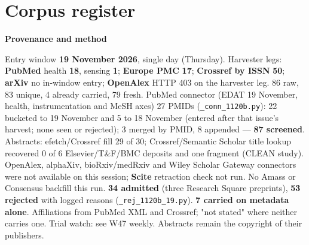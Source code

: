 \documentclass[10pt]{article}
\begin{document}
\clearpage
\section*{\sffamily\bfseries\color{Deep}Corpus register}
\vspace{-1.5mm}{\color{Amber}\rule{\linewidth}{1.1pt}}\vspace{2.5mm}



\vspace{2mm}

\begin{keybox}
{\sffamily\bfseries\footnotesize\color{Deep}Provenance and method}\\[1.2mm]
{\fontsize{7.2}{8.8}\selectfont
Entry window \textbf{19 November 2026}, single day (Thursday). Harvester legs: \textbf{PubMed} health \textbf{18}, sensing \textbf{1}; \textbf{Europe PMC} \textbf{17}; \textbf{Crossref by ISSN} \textbf{50}; \textbf{arXiv} no in-window entry; \textbf{OpenAlex} HTTP 403 on the harvester leg. 86 raw, 83 unique, 4 already carried, 79 fresh. PubMed connector (EDAT 19 November, health, instrumentation and MeSH axes) 27 PMIDs (\texttt{\_conn\_1120b.py}): 22 bucketed to 19 November and 5 to 18 November (entered after that issue's harvest; none seen or rejected); 3 merged by PMID, 8 appended --- \textbf{87 screened}. Abstracts: efetch/Crossref fill 29 of 30; Crossref/Semantic Scholar title lookup recovered 0 of 6 Elsevier/T\&F/BMC deposits and one fragment (CLEAN study).
OpenAlex, alphaXiv, bioRxiv/medRxiv and Wiley Scholar Gateway connectors were not available on this session; \textbf{Scite} retraction check not run. No Amass or Consensus backfill this run.
\textbf{34 admitted} (three Research Square preprints), \textbf{53 rejected} with logged reasons (\texttt{\_rej\_1120b\_19.py}). \textbf{7 carried on metadata alone}. Affiliations from PubMed XML and Crossref; "not stated" where neither carries one. Trial watch: see W47 weekly.
Abstracts remain the copyright of their publishers.\par}
\end{keybox}
\end{document}
